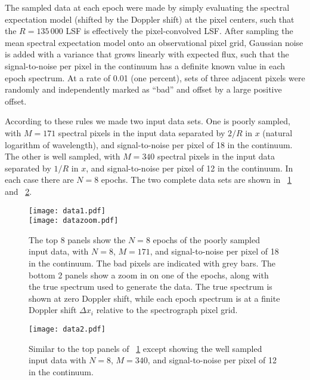 \documentclass[modern, linenumbers]{aastex631}
\newlength{\figurewidth}
\begin{document}
The sampled data at each epoch were made by simply evaluating the spectral expectation model (shifted by the Doppler shift) at the pixel centers, such that the $R=135\,000$ LSF is effectively the pixel-convolved LSF.
After sampling the mean spectral expectation model onto an observational pixel grid, Gaussian noise is added with a variance that grows linearly with expected flux, such that the signal-to-noise per pixel in the continuum has a definite known value in each epoch spectrum.
At a rate of 0.01 (one percent), sets of three adjacent pixels were randomly and independently marked as ``bad'' and offset by a large positive offset.

According to these rules we made two input data sets.
One is poorly sampled, with $M=171$ spectral pixels in the input data separated by $2/R$ in $x$ (natural logarithm of wavelength), and signal-to-noise per pixel of 18 in the continuum.
The other is well sampled, with $M=340$ spectral pixels in the input data separated by $1/R$ in $x$, and signal-to-noise per pixel of 12 in the continuum.
In each case there are $N=8$ epochs.
The two complete data sets are shown in \figurename~\ref{fig:data1} and \figurename~\ref{fig:data2}.
\begin{figure}[t!]
    \begin{mdframed}\begin{center}
    \texttt{[image: data1.pdf]}\\
    \texttt{[image: datazoom.pdf]}
    \end{center}
    \caption{The top 8 panels show the $N=8$ epochs of the poorly sampled input data, with $N=8$, $M=171$, and signal-to-noise per pixel of 18 in the continuum. The bad pixels are indicated with grey bars. The bottom 2 panels show a zoom in on one of the epochs, along with the true spectrum used to generate the data. The true spectrum is shown at zero Doppler shift, while each epoch spectrum is at a finite Doppler shift $\Delta x_i$ relative to the spectrograph pixel grid.\label{fig:data1}}
    \end{mdframed}
\end{figure}
\begin{figure}[t!]
    \begin{mdframed}\begin{center}
    \texttt{[image: data2.pdf]}
    \end{center}
    \caption{Similar to the top panels of \figurename~\ref{fig:data1} except showing the well sampled input data with $N=8$, $M=340$, and signal-to-noise per pixel of 12 in the continuum.\label{fig:data2}}
    \end{mdframed}
\end{figure}
\end{document}

